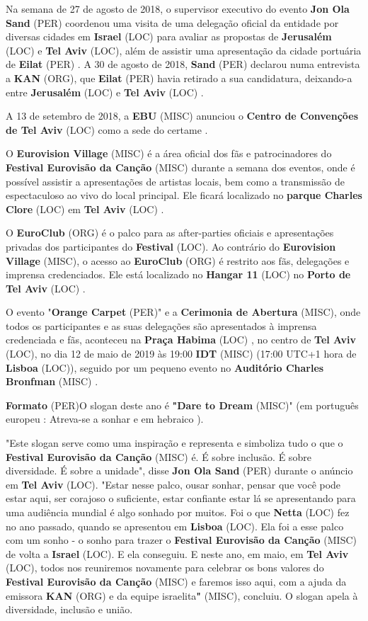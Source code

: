 \documentclass[12pt,a4paper]{article}
\begin{document}
Na semana de 27 de agosto de 2018, o supervisor executivo do evento \textbf{Jon Ola Sand} (PER) coordenou uma visita de uma delegação oficial da entidade por diversas cidades em \textbf{Israel} (LOC) para avaliar as propostas de \textbf{Jerusalém} (LOC) e \textbf{Tel Aviv} (LOC), além de assistir uma apresentação da cidade portuária de \textbf{Eilat} (PER) . A 30 de agosto de 2018, \textbf{Sand} (PER) declarou numa entrevista a \textbf{KAN} (ORG), que \textbf{Eilat} (PER) havia retirado a sua candidatura, deixando-a entre \textbf{Jerusalém} (LOC) e \textbf{Tel Aviv} (LOC) .

A 13 de setembro de 2018, a \textbf{EBU} (MISC) anunciou o \textbf{Centro de Convenções de Tel Aviv} (LOC) como a sede do certame .

O \textbf{Eurovision Village} (MISC) é a área oficial dos fãs e patrocinadores do \textbf{Festival Eurovisão da Canção} (MISC) durante a semana dos eventos, onde é possível assistir a apresentações de artistas locais, bem como a transmissão de espectaculoso ao vivo do local principal. Ele ficará localizado no \textbf{parque Charles Clore} (LOC) em \textbf{Tel Aviv} (LOC) .

O \textbf{EuroClub} (ORG) é o palco para as after-parties oficiais e apresentações privadas dos participantes do \textbf{Festival} (LOC). Ao contrário do \textbf{Eurovision Village} (MISC), o acesso ao \textbf{EuroClub} (ORG) é restrito aos fãs, delegações e imprensa credenciados. Ele está localizado no \textbf{Hangar 11} (LOC) no \textbf{Porto de Tel Aviv} (LOC) .

O evento "\textbf{Orange Carpet} (PER)" e a \textbf{Cerimonia de Abertura} (MISC), onde todos os participantes e as suas delegações são apresentados à imprensa credenciada e fãs, aconteceu na \textbf{Praça Habima} (LOC) , no centro de \textbf{Tel Aviv} (LOC), no dia 12 de maio de 2019 às 19:00 \textbf{IDT} (MISC) (17:00 UTC+1 hora de \textbf{Lisboa} (LOC)), seguido por um pequeno evento no \textbf{Auditório Charles Bronfman} (MISC) .



\textbf{Formato} (PER)O slogan deste ano é \textbf{"Dare to Dream} (MISC)" (em português europeu : Atreva-se a sonhar e em hebraico  ).

"Este slogan serve como uma inspiração e representa e simboliza tudo o que o \textbf{Festival Eurovisão da Canção} (MISC) é. É sobre inclusão. É sobre diversidade. É sobre a unidade", disse \textbf{Jon Ola Sand} (PER) durante o anúncio em \textbf{Tel Aviv} (LOC). "Estar nesse palco, ousar sonhar, pensar que você pode estar aqui, ser corajoso o suficiente, estar confiante estar lá se apresentando para uma audiência mundial é algo sonhado por muitos. Foi o que \textbf{Netta} (LOC) fez no ano passado, quando se apresentou em \textbf{Lisboa} (LOC). Ela foi a esse palco com um sonho - o sonho para trazer o \textbf{Festival Eurovisão da Canção} (MISC) de volta a \textbf{Israel} (LOC). E ela conseguiu. E neste ano, em maio, em \textbf{Tel Aviv} (LOC), todos nos reuniremos novamente para celebrar os bons valores do \textbf{Festival Eurovisão da Canção} (MISC) e faremos isso aqui, com a ajuda da emissora \textbf{KAN} (ORG) e da equipe israelita\textbf{"} (MISC), concluiu. O slogan apela à diversidade, inclusão e união.
\end{document}
